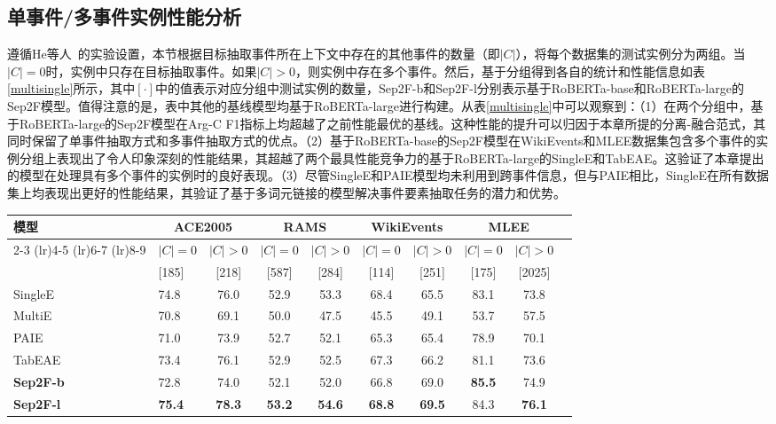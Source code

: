 \subsection{单事件/多事件实例性能分析}遵循He等人~\cite{he2023revisiting}的实验设置，本节根据目标抽取事件所在上下文中存在的其他事件的数量（即$|C|$），将每个数据集的测试实例分为两组。当$|C|=0$时，实例中只存在目标抽取事件。如果$|C|>0$，则实例中存在多个事件。然后，基于分组得到各自的统计和性能信息如表\ref{multisingle}所示，其中$[\cdot]$中的值表示对应分组中测试实例的数量，Sep2F-b和Sep2F-l分别表示基于RoBERTa-base和RoBERTa-large的Sep2F模型。值得注意的是，表中其他的基线模型均基于RoBERTa-large进行构建。从表\ref{multisingle}中可以观察到：（1）在两个分组中，基于RoBERTa-large的Sep2F模型在Arg-C F1指标上均超越了之前性能最优的基线。这种性能的提升可以归因于本章所提的分离-融合范式，其同时保留了单事件抽取方式和多事件抽取方式的优点。（2）基于RoBERTa-base的Sep2F模型在WikiEvents和MLEE数据集包含多个事件的实例分组上表现出了令人印象深刻的性能结果，其超越了两个最具性能竞争力的基于RoBERTa-large的SingleE和TabEAE。这验证了本章提出的模型在处理具有多个事件的实例时的良好表现。（3）尽管SingleE和PAIE模型均未利用到跨事件信息，但与PAIE相比，SingleE在所有数据集上均表现出更好的性能结果，其验证了基于多词元链接的模型解决事件要素抽取任务的潜力和优势。

\begin{table*}[htp]
\small
\centering
\caption{四种数据集上单事件/多事件实例对应的Arg-C F1（\%）指标结果}
\begin{tabular}{llcccccccc}
\toprule
\multicolumn{1}{l}{\multirow{3}{*}{模型}} & \multicolumn{2}{c}{ACE2005} & \multicolumn{2}{c}{RAMS} & \multicolumn{2}{c}{WikiEvents} & \multicolumn{2}{c}{MLEE} \\ \cmidrule(lr){2-3} \cmidrule(lr){4-5} \cmidrule(lr){6-7} \cmidrule(lr){8-9}
\multicolumn{1}{l}{} & $|C|=0$ & $|C|>0$ & $|C|=0$ & $|C|>0$ & $|C|=0$ & $|C|>0$  & $|C|=0$  & $|C|>0$ \\ 
\multicolumn{1}{l}{} & [185] & [218] & [587] & [284] & [114] &  [251] &  [175] &  [2025]  \\ \midrule
\multicolumn{1}{l}{SingleE} & 74.8 & 76.0 & 52.9 & 53.3 & 68.4 & 65.5 & 83.1 & 73.8 \\
\multicolumn{1}{l}{MultiE}  & 70.8 & 69.1 & 50.0 & 47.5 & 45.5 & 49.1 & 53.7 & 57.5 \\
\multicolumn{1}{l}{PAIE}  & 71.0 & 73.9 & 52.7 & 52.1 & 65.3 & 65.4 & 78.9 & 70.1 \\
\multicolumn{1}{l}{TabEAE} & 73.4 & 76.1 & 52.9 &  52.5 & 67.3 &  66.2 & 81.1 & 73.6 \\
\midrule
\multicolumn{1}{l}{\textbf{Sep2F-b}} & 72.8 & 74.0 & 52.1 & 52.0 & 66.8 & 69.0 & \textbf{85.5} & 74.9 \\
\multicolumn{1}{l}{\textbf{Sep2F-l}} & \textbf{75.4} & \textbf{78.3} & \textbf{53.2} & \textbf{54.6} & \textbf{68.8} & \textbf{69.5} & 84.3 & \textbf{76.1} \\
\bottomrule
\end{tabular}
\label{multisingle}
\end{table*}

